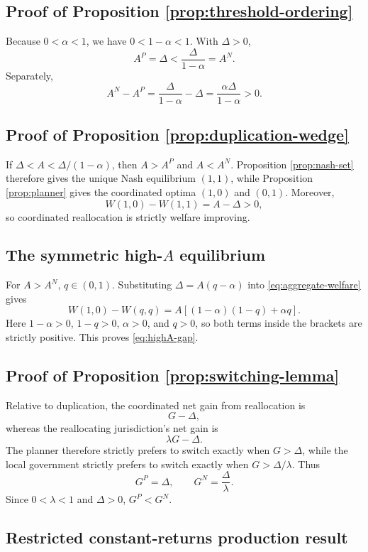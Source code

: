 \subsection{Proof of Proposition \ref{prop:threshold-ordering}}

Because $0<\alpha<1$, we have $0<1-\alpha<1$. With $\Delta>0$,
\[
A^P=\Delta<\frac{\Delta}{1-\alpha}=A^N.
\]
Separately,
\[
A^N-A^P
=\frac{\Delta}{1-\alpha}-\Delta
=\frac{\alpha\Delta}{1-\alpha}>0.
\]

\subsection{Proof of Proposition \ref{prop:duplication-wedge}}

If $\Delta<A<\Delta/(1-\alpha)$, then $A>A^P$ and $A<A^N$. Proposition \ref{prop:nash-set} therefore gives the unique Nash equilibrium $(1,1)$, while Proposition \ref{prop:planner} gives the coordinated optima $(1,0)$ and $(0,1)$. Moreover,
\[
W(1,0)-W(1,1)=A-\Delta>0,
\]
so coordinated reallocation is strictly welfare improving.

\subsection{The symmetric high-$A$ equilibrium}

For $A>A^N$, $q\in(0,1)$. Substituting $\Delta=A(q-\alpha)$ into \eqref{eq:aggregate-welfare} gives
\[
W(1,0)-W(q,q)
=A\left[(1-\alpha)(1-q)+\alpha q\right].
\]
Here $1-\alpha>0$, $1-q>0$, $\alpha>0$, and $q>0$, so both terms inside the brackets are strictly positive. This proves \eqref{eq:highA-gap}.

\subsection{Proof of Proposition \ref{prop:switching-lemma}}

Relative to duplication, the coordinated net gain from reallocation is
\[
G-\Delta,
\]
whereas the reallocating jurisdiction's net gain is
\[
\lambda G-\Delta.
\]
The planner therefore strictly prefers to switch exactly when $G>\Delta$, while the local government strictly prefers to switch exactly when $G>\Delta/\lambda$. Thus
\[
G^P=\Delta,
\qquad
G^N=\frac{\Delta}{\lambda}.
\]
Since $0<\lambda<1$ and $\Delta>0$, $G^P<G^N$.

\subsection{Restricted constant-returns production result}

